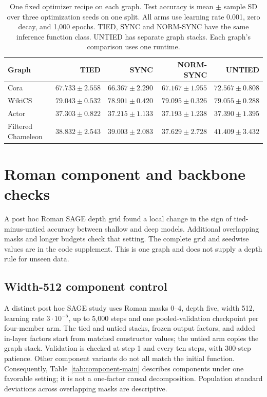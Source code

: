\begin{table}[t]
\centering
\caption{One fixed optimizer recipe on each graph. Test accuracy is mean $\pm$ sample SD over three optimization seeds on one split. All arms use learning rate 0.001, zero decay, and 1,000 epochs. TIED, SYNC and NORM-SYNC have the same inference function class. UNTIED has separate graph stacks. Each graph's comparison uses one runtime.}
\label{tab:optimizer-default}
\small
\setlength{\tabcolsep}{4pt}
\begin{tabular}{lrrrr}
\toprule
Graph & TIED & SYNC & NORM-SYNC & UNTIED\\
\midrule
Cora & $67.733 \pm 2.558$ & $66.367 \pm 2.290$ & $67.167 \pm 1.955$ & $72.567 \pm 0.808$\\
WikiCS & $79.043 \pm 0.532$ & $78.901 \pm 0.420$ & $79.095 \pm 0.326$ & $79.055 \pm 0.288$\\
Actor & $37.303 \pm 0.822$ & $37.215 \pm 1.133$ & $37.193 \pm 1.238$ & $37.390 \pm 1.395$\\
Filtered Chameleon & $38.832 \pm 2.543$ & $39.003 \pm 2.083$ & $37.629 \pm 2.728$ & $41.409 \pm 3.432$\\
\bottomrule
\end{tabular}
\end{table}

\section{Roman component and backbone checks}\label{app:depth-grid}
A post hoc Roman SAGE depth grid found a local change in the
sign of tied-minus-untied accuracy between shallow and deep
models. Additional overlapping masks and longer budgets check
that setting. The complete grid and seedwise values are in the
code supplement. This is one graph and does not supply a depth
rule for unseen data.

\subsection{Width-512 component control}\label{app:controls}
A distinct post hoc SAGE study uses Roman masks 0--4, depth five,
width 512, learning rate $3\cdot10^{-5}$, up to 5,000 steps and one
pooled-validation checkpoint per four-member arm. The tied and untied
stacks, frozen output factors, and added in-layer factors start from
matched constructor values; the untied arm copies the graph stack.
Validation is checked at step 1 and every ten steps, with 300-step
patience. Other component variants do not all match the initial function.
Consequently, Table~\ref{tab:component-main} describes components under one favorable
setting; it is not a one-factor causal decomposition. Population
standard deviations across overlapping masks are descriptive.

